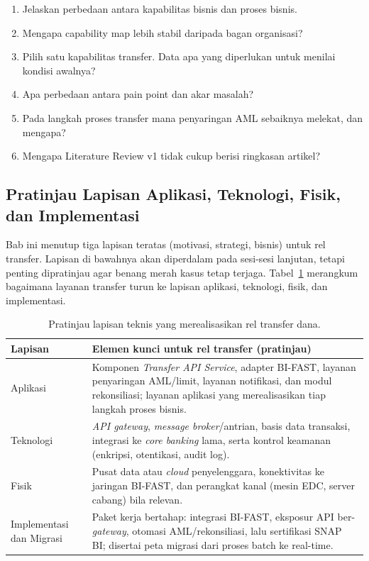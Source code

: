 \begin{enumerate}
  \item Jelaskan perbedaan antara kapabilitas bisnis dan proses bisnis.
  \item Mengapa capability map lebih stabil daripada bagan organisasi?
  \item Pilih satu kapabilitas transfer. Data apa yang diperlukan untuk menilai
        kondisi awalnya?
  \item Apa perbedaan antara pain point dan akar masalah?
  \item Pada langkah proses transfer mana penyaringan AML sebaiknya melekat, dan
        mengapa?
  \item Mengapa Literature Review v1 tidak cukup berisi ringkasan artikel?
\end{enumerate}

\subsection*{Pratinjau Lapisan Aplikasi, Teknologi, Fisik, dan Implementasi}
\label{sec:pratinjau-lapisan-teknis}

Bab ini menutup tiga lapisan teratas (motivasi, strategi, bisnis) untuk rel
transfer. Lapisan di bawahnya akan diperdalam pada sesi-sesi lanjutan, tetapi
penting dipratinjau agar benang merah kasus tetap terjaga.
Tabel~\ref{tab:pratinjau-lapisan} merangkum bagaimana layanan transfer turun ke
lapisan aplikasi, teknologi, fisik, dan implementasi.

\begin{table}[htbp]
\centering
\scriptsize
\caption{Pratinjau lapisan teknis yang merealisasikan rel transfer dana.}
\label{tab:pratinjau-lapisan}
\begin{tabularx}{\textwidth}{@{}p{} X@{}}
\hline
\textbf{Lapisan} & \textbf{Elemen kunci untuk rel transfer (pratinjau)} \\
\hline
Aplikasi & Komponen \emph{Transfer API Service}, adapter BI-FAST, layanan
penyaringan AML/limit, layanan notifikasi, dan modul rekonsiliasi; layanan
aplikasi yang merealisasikan tiap langkah proses bisnis. \\
Teknologi & \emph{API gateway}, \emph{message broker}/antrian, basis data
transaksi, integrasi ke \emph{core banking} lama, serta kontrol keamanan
(enkripsi, otentikasi, audit log). \\
Fisik & Pusat data atau \emph{cloud} penyelenggara, konektivitas ke jaringan
BI-FAST, dan perangkat kanal (mesin EDC, server cabang) bila relevan. \\
Implementasi dan Migrasi & Paket kerja bertahap: integrasi BI-FAST, eksposur API
ber-\emph{gateway}, otomasi AML/rekonsiliasi, lalu sertifikasi SNAP BI; disertai
peta migrasi dari proses batch ke real-time. \\
\hline
\end{tabularx}
\end{table}

